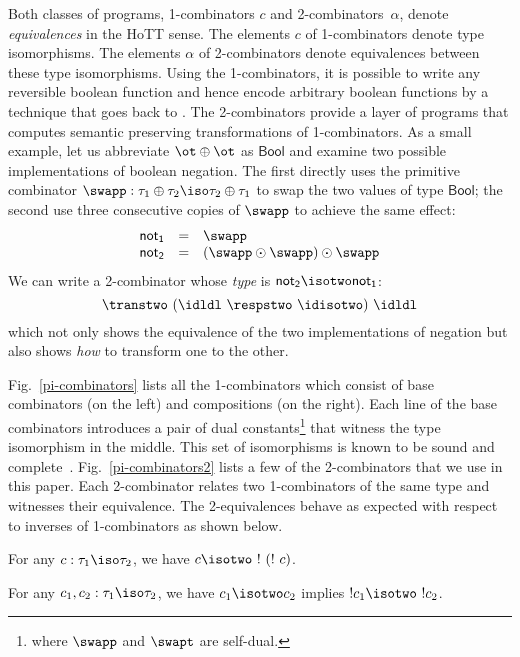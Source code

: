 Both classes of programs, 1-combinators $c$ and
2-combinators~$\alpha$, denote \emph{equivalences} in the HoTT
sense. The elements $c$ of 1-combinators denote type isomorphisms. The
elements $\alpha$ of 2-combinators denote equivalences between these
type isomorphisms. Using the 1-combinators, it is possible to write
any reversible boolean function and hence encode arbitrary boolean
functions by a technique that goes back to \citet{Toffoli:1980}. The
2-combinators provide a layer of programs that computes semantic
preserving transformations of 1-combinators. As a small example, let
us abbreviate $\ot \oplus \ot$ as $\mathsf{Bool}$ and examine two
possible implementations of boolean negation. The first directly uses
the primitive combinator
$\swapp : \tau_1 \oplus \tau_2 \iso \tau_2 \oplus \tau_1$ to swap the
two values of type $\mathsf{Bool}$; the second use three consecutive
copies of $\swapp$ to achieve the same effect:
\[\begin{array}{rcl}
\mathsf{not_1} &=& \swapp \\
\mathsf{not_2} &=& (\swapp \odot \swapp) \odot \swapp 
\end{array}\]
We can write a 2-combinator whose \emph{type} is $\mathsf{not_2}
\isotwo \mathsf{not_1}$:
\[
\transtwo~(\idldl ~\respstwo~ \idisotwo)~\idldl
\]
which not only shows the equivalence of the two implementations of
negation but also shows \emph{how} to transform one to the other.

Fig.~\ref{pi-combinators} lists all the 1-combinators which consist of
base combinators (on the left) and compositions (on the right). Each
line of the base combinators introduces a pair of dual
constants\footnote{where $\swapp$ and $\swapt$ are self-dual.} that
witness the type isomorphism in the middle. This set of isomorphisms
is known to be sound and
complete~\cite{Fiore:2004,fiore-remarks}. Fig.~\ref{pi-combinators2}
lists a few of the 2-combinators that we use in this paper. Each
2-combinator relates two 1-combinators of the same type and witnesses
their equivalence. The 2-equivalences behave as expected with respect
to inverses of 1-combinators as shown below. 

\begin{proposition}
For any $c : \tau_1 \iso \tau_2$, we have $c \isotwo ~!~(!~c)$.
\end{proposition} 

\begin{proposition}
For any $c_1,c_2 : \tau_1 \iso \tau_2$, we have $c_1 \isotwo c_2$ implies
$!c_1 \isotwo ~!c_2$.
\end{proposition} 

